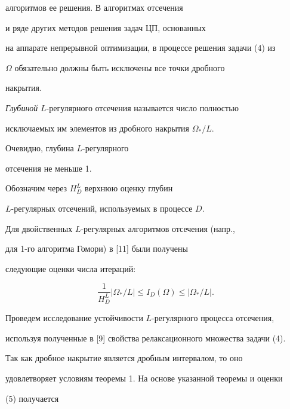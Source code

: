алгоритмов ее решения. В алгоритмах отсечения 


и ряде других методов решения задач ЦП, основанных


на аппарате непрерывной оптимизации, в процессе решения задачи (4) из


$ \Omega$ обязательно должны быть исключены все точки дробного


накрытия.





{\it Глубиной} $L$-регулярного отсечения  называется число полностью 


исключаемых им элементов из дробного накрытия $ \Omega_{*}/L$.


Очевидно, глубина $L$-регулярного


отсечения не меньше 1.


Обозначим через $H^{L}_{D}$   верхнюю оценку глубин


$L$-регулярных отсечений, используемых в процессе $D$. 





Для двойственных $L$-регулярных алгоритмов отсечения (напр., 


для 1-го алгоритма Гомори) в [11] были получены


следующие оценки числа итераций:


\begin{equation}


\frac{1}{H^{L}_{D}} | \Omega_{*}/L 


| \leq I_{D}( \Omega) \leq


| \Omega_{*}/L |.


\end{equation}





Проведем исследование устойчивости $L$-регулярного процесса отсечения,


используя полученные в [9] свойства релаксационного множества задачи (4).


Так как дробное накрытие является  дробным интервалом, то оно


удовлетворяет условиям теоремы 1. На основе указанной теоремы  и оценки


(5) получается






